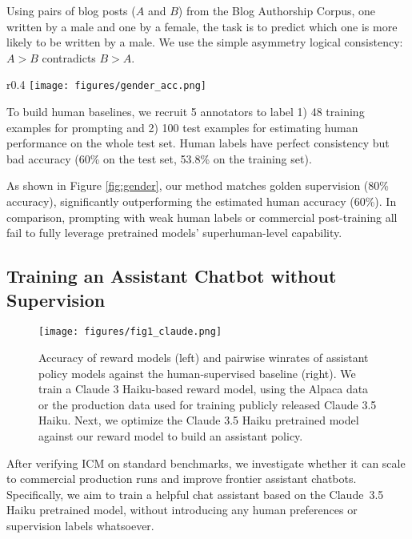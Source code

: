 \documentclass{article}
\newcommand{\ourmethod}[0]{\textsc{ICM}\xspace}
\begin{document}
Using pairs of blog posts ($A$ and $B$) from the Blog Authorship Corpus, one written by a male and one by a female, the task is to predict which one is more likely to be written by a male. We use the simple asymmetry logical consistency: $A>B$ contradicts $B>A$.

\begin{wrapfigure}{r}{0.4\linewidth}
    \centering
    \vspace{-6mm}
    \texttt{[image: figures/gender\_acc.png]}
    \caption{Results on gender prediction.}
    \vspace{-10mm}
    \label{fig:gender}
\end{wrapfigure}

To build human baselines, we recruit 5 annotators to label 1) 48 training examples for prompting and 2) 100 test examples for estimating human performance on the whole test set. Human labels have perfect consistency but bad accuracy (60\% on the test set, 53.8\% on the training set).

As shown in Figure \ref{fig:gender}, our method matches golden supervision (80\% accuracy), significantly outperforming the estimated human accuracy (60\%). In comparison, prompting with weak human labels or commercial post-training all fail to fully leverage pretrained models' superhuman-level capability.


\subsection{Training an Assistant Chatbot without Supervision} \label{sec:assistant}

\begin{figure}[H]
    \centering
    \texttt{[image: figures/fig1\_claude.png]}
    \caption{Accuracy of reward models (left) and pairwise winrates of assistant policy models against the human-supervised baseline (right). We train a Claude 3 Haiku-based reward model, using the Alpaca data or the production data used for training publicly released Claude 3.5 Haiku. Next, we optimize the Claude 3.5 Haiku pretrained model against our reward model to build an assistant policy.}
    \label{fig:results_claude}
\end{figure}

After verifying \ourmethod on standard benchmarks, we investigate whether it can scale to commercial production runs and improve frontier assistant chatbots. Specifically, we aim to train a helpful chat assistant based on the Claude~3.5 Haiku pretrained model, without introducing any human preferences or supervision labels whatsoever.
\end{document}
